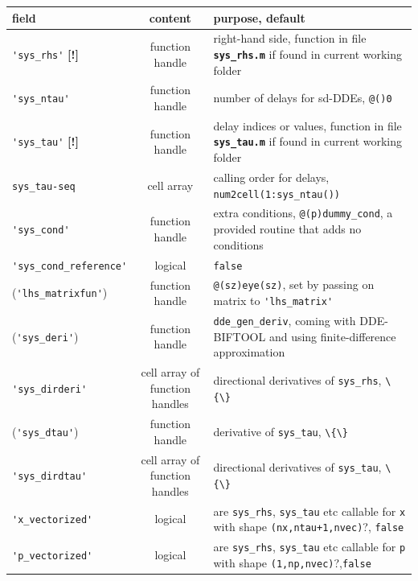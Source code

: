 \documentclass[10pt]{scrartcl}
\newcommand{\DDEBIFCODE}{\textsc{DDE-BIFTOOL}}
\newcommand{\file}[1]{\textbf{\texttt{#1}}}
\newcommand{\blist}[1]{\mbox{\lstinline!#1!}}
\begin{document}
 \begin{table}[htbp]
  \centering
  \begin{tabular}[t]{l@{\hspace*{1ex}}c@{\hspace*{3ex}}p{}}
      \hline\noalign{\smallskip}
      field     & content &  purpose, default   \\\hline\noalign{\smallskip}
      \blist{'sys_rhs'} \textbf{\textsf{[!]}} & function handle &  right-hand side, function in file \file{sys\_rhs.m} if found in 
      current working folder \\[0.5ex]
      \blist{'sys_ntau'} & function handle &  number of delays for sd-DDEs, \blist{@()0} \\[0.5ex]
      \blist{'sys_tau'} \textbf{\textsf{[!]}} & function handle &  delay indices or values, function in file 
      \file{sys\_tau.m} if found in current working folder\\[0.5ex]
      \blist{sys_tau-seq} & cell array & calling order for delays, \blist{num2cell(1:sys_ntau())}\\[0.5ex]
      \blist{'sys_cond'} & function handle & extra conditions, \blist{@(p)dummy_cond},  a provided routine that adds no conditions\\[0.5ex]
      \blist{'sys_cond_reference'} & logical & \blist{false}\\[0.5ex]
      (\blist{'lhs_matrixfun'}) & function handle & \blist{@(sz)eye(sz)}, set by passing on matrix to \blist{'lhs_matrix'}\\[0.5ex]
      (\blist{'sys_deri'}) & function handle & \blist{dde_gen_deriv}, coming with 
      \DDEBIFCODE{} and using finite-difference approximation\\[0.5ex]
      \blist{'sys_dirderi'} & cell array of function handles & directional derivatives of \blist{sys_rhs}, \blist{\{\}}\\[0.5ex]
      (\blist{'sys_dtau'}) & function handle &  derivative of \blist{sys_tau}, \blist{\{\}}\\[0.5ex]
      \blist{'sys_dirdtau'} & cell array of function handles &  directional derivatives of \blist{sys_tau}, \blist{\{\}}\\[0.5ex]
      \blist{'x_vectorized'} & logical &  are \blist{sys_rhs}, \blist{sys_tau} etc callable for \blist{x} with shape \blist{(nx,ntau+1,nvec)}?, \blist{false}\\[0.5ex]
      \blist{'p_vectorized'} & logical &  are \blist{sys_rhs}, \blist{sys_tau} etc callable for \blist{p} with shape \blist{(1,np,nvec)}?,\blist{false}\\[0.5ex]

\end{tabular}
\end{table}
\end{document}
